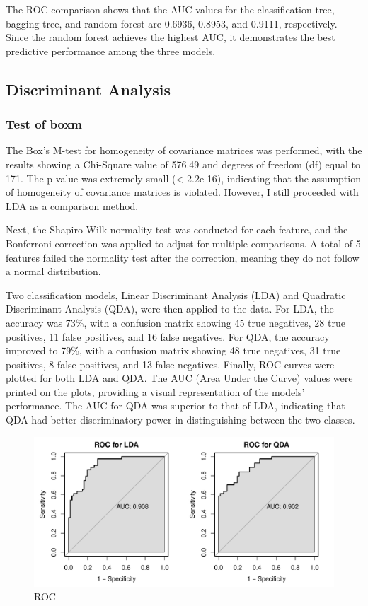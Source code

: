 \documentclass[
  12pt,
  letterpaper,
  DIV=11,
  numbers=noendperiod]{scrartcl}
\begin{document}
The ROC comparison shows that the AUC values for the classification
tree, bagging tree, and random forest are 0.6936, 0.8953, and 0.9111,
respectively. Since the random forest achieves the highest AUC, it
demonstrates the best predictive performance among the three models.

\subsection{Discriminant Analysis}\label{discriminant-analysis}

\subsubsection{Test of boxm}\label{test-of-boxm}

The Box's M-test for homogeneity of covariance matrices was performed,
with the results showing a Chi-Square value of 576.49 and degrees of
freedom (df) equal to 171. The p-value was extremely small (\textless{}
2.2e-16), indicating that the assumption of homogeneity of covariance
matrices is violated. However, I still proceeded with LDA as a
comparison method.

Next, the Shapiro-Wilk normality test was conducted for each feature,
and the Bonferroni correction was applied to adjust for multiple
comparisons. A total of 5 features failed the normality test after the
correction, meaning they do not follow a normal distribution.

Two classification models, Linear Discriminant Analysis (LDA) and
Quadratic Discriminant Analysis (QDA), were then applied to the data.
For LDA, the accuracy was 73\%, with a confusion matrix showing 45 true
negatives, 28 true positives, 11 false positives, and 16 false
negatives. For QDA, the accuracy improved to 79\%, with a confusion
matrix showing 48 true negatives, 31 true positives, 8 false positives,
and 13 false negatives. Finally, ROC curves were plotted for both LDA
and QDA. The AUC (Area Under the Curve) values were printed on the
plots, providing a visual representation of the models' performance. The
AUC for QDA was superior to that of LDA, indicating that QDA had better
discriminatory power in distinguishing between the two classes.

\begin{figure}[H]

{\centering \includegraphics{me_files/figure-pdf/ROC of LDA and QDA-1.pdf}

}

\caption{ROC}

\end{figure}%
\end{document}
